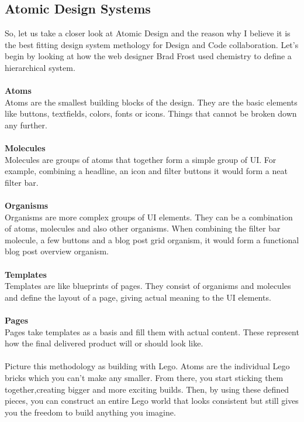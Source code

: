 \newpage
\subsection{Atomic Design Systems} \label{Atomic Design Systems}
So, let us take a closer look at Atomic Design and the reason why I believe it is the best fitting
design system methology for Design and Code collaboration. Let's begin by looking at how the web
designer Brad Frost used chemistry to define a hierarchical system. \\\\
\textbf{Atoms} \\
Atoms are the smallest building blocks of the design. They are the basic elements like buttons,
textfields, colors, fonts or icons. Things that cannot be broken down any further. \\\\
\textbf{Molecules} \\
Molecules are groups of atoms that together form a simple group of UI. For example, combining
a headline, an icon and filter buttons it would form a neat filter bar. \\\\
\textbf{Organisms} \\
Organisms are more complex groups of UI elements. They can be a combination of atoms, molecules and
also other organisms. When combining the filter bar molecule, a few buttons and a blog post grid
organism, it would form a functional blog post overview organism. \\\\
\textbf{Templates} \\
Templates are like blueprints of pages. They consist of organisms and molecules and define the
layout of a page, giving actual meaning to the UI elements. \\\\
\textbf{Pages}\\
Pages take templates as a basis and fill them with actual content. These represent how the final
delivered product will or should look like. \\
\\

Picture this methodology as building with Lego. Atoms are the individual Lego bricks
which you can't make any smaller. From there, you start sticking them together,creating bigger and
more exciting builds. Then, by using these defined pieces, you can construct an entire Lego world
that looks consistent but still gives you the freedom to build anything you imagine.

